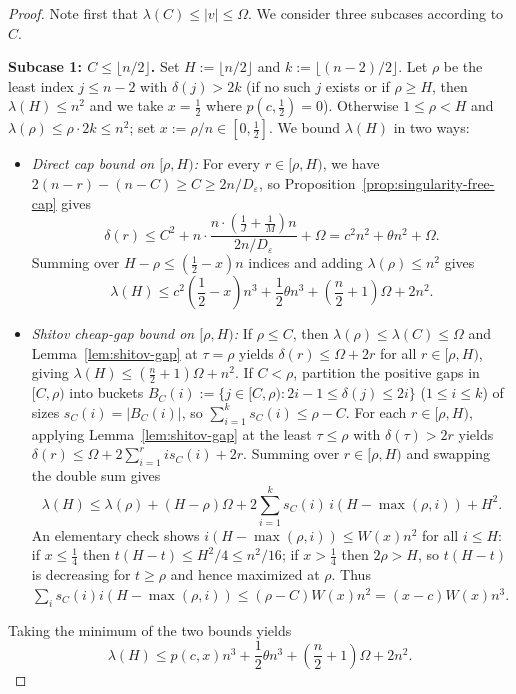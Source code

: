 \documentclass[11pt]{article}
\theoremstyle{definition}
\theoremstyle{remark}
\begin{document}
\begin{proof}
Note first that $\lambda(C) \le |v| \le \Omega$. We consider three subcases according to $C$.

\smallskip
\noindent\textbf{Subcase 1: $C \le \lfloor n / 2 \rfloor$.}
Set $H := \lfloor n/2 \rfloor$ and $k := \lfloor (n - 2)/2 \rfloor$. Let $\rho$ be the least index $j \le n - 2$ with $\delta(j) > 2k$ (if no such $j$ exists or if $\rho \ge H$, then $\lambda(H) \le n^2$ and we take $x = \frac{1}{2}$ where $p(c, \frac{1}{2}) = 0$). Otherwise $1 \le \rho < H$ and $\lambda(\rho) \le \rho \cdot 2k \le n^2$; set $x := \rho / n \in [0, \frac{1}{2}]$. We bound $\lambda(H)$ in two ways:
\begin{itemize}[leftmargin=2em]
  \item \emph{Direct cap bound on $[\rho, H)$:} For every $r \in [\rho, H)$, we have $2(n - r) - (n - C) \ge C \ge 2 n / D_\varepsilon$, so Proposition~\ref{prop:singularity-free-cap} gives
  \[
    \delta(r) \le C^2 + n \cdot \frac{n \cdot (\frac{1}{J} + \frac{1}{M}) n}{2 n / D_\varepsilon} + \Omega
    = c^2 n^2 + \theta n^2 + \Omega.
  \]
  Summing over $H - \rho \le (\frac{1}{2} - x) n$ indices and adding $\lambda(\rho) \le n^2$ gives
  \[
    \lambda(H) \le c^2 \left(\frac{1}{2} - x\right) n^3 + \frac{1}{2} \theta n^3 + \left(\frac{n}{2} + 1\right)\Omega + 2 n^2.
  \]
  \item \emph{Shitov cheap-gap bound on $[\rho, H)$:} If $\rho \le C$, then $\lambda(\rho) \le \lambda(C) \le \Omega$ and Lemma~\ref{lem:shitov-gap} at $\tau = \rho$ yields $\delta(r) \le \Omega + 2r$ for all $r \in [\rho, H)$, giving $\lambda(H) \le (\frac{n}{2} + 1)\Omega + n^2$. If $C < \rho$, partition the positive gaps in $[C, \rho)$ into buckets $B_C(i) := \{j \in [C, \rho) : 2i - 1 \le \delta(j) \le 2i\}$ ($1 \le i \le k$) of sizes $s_C(i) = |B_C(i)|$, so $\sum_{i=1}^k s_C(i) \le \rho - C$. For each $r \in [\rho, H)$, applying Lemma~\ref{lem:shitov-gap} at the least $\tau \le \rho$ with $\delta(\tau) > 2r$ yields $\delta(r) \le \Omega + 2 \sum_{i=1}^r i s_C(i) + 2r$. Summing over $r \in [\rho, H)$ and swapping the double sum gives
  \[
    \lambda(H) \le \lambda(\rho) + (H - \rho)\Omega + 2 \sum_{i=1}^k s_C(i)\, i (H - \max(\rho, i)) + H^2.
  \]
  An elementary check shows $i(H - \max(\rho, i)) \le W(x) n^2$ for all $i \le H$: if $x \le \frac{1}{4}$ then $t(H-t) \le H^2/4 \le n^2/16$; if $x > \frac{1}{4}$ then $2\rho > H$, so $t(H-t)$ is decreasing for $t \ge \rho$ and hence maximized at $\rho$. Thus $\sum_i s_C(i) i(H - \max(\rho, i)) \le (\rho - C) W(x) n^2 = (x - c) W(x) n^3$.
\end{itemize}
Taking the minimum of the two bounds yields
\begin{equation}\label{eq:prefix-pay}
  \lambda(H) \le p(c, x) n^3 + \frac{1}{2} \theta n^3 + \left(\frac{n}{2} + 1\right)\Omega + 2 n^2.
\end{equation}


\end{proof}
\end{document}
